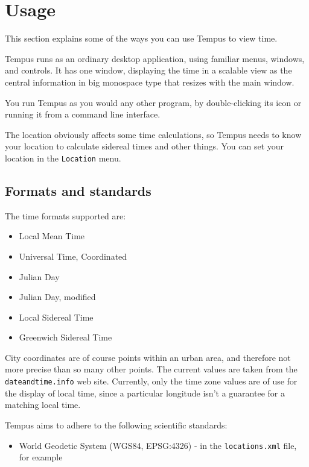 \section{Usage}

This section explains some of the ways you can use Tempus to view time.

Tempus runs as an ordinary desktop application, using familiar menus, windows, and controls. It has one window, displaying the time in a scalable view as the central information in big monospace type that resizes with the main window.

You run Tempus as you would any other program, by double-clicking its icon or running it from a command line interface. 

The location obviously affects some time calculations, so Tempus needs to know your location to calculate sidereal times and other things. You can set your location in the \texttt{Location} menu.

\subsection{Formats and standards}

The time formats supported are:
\begin{itemize}
    \item Local Mean Time
    \item Universal Time, Coordinated
    \item Julian Day
    \item Julian Day, modified
    \item Local Sidereal Time
    \item Greenwich Sidereal Time
\end{itemize}

City coordinates are of course points within an urban area, and therefore not more precise than so many other points. The current values are taken from the \texttt{dateandtime.info} web site. Currently, only the time zone values are of use for the display of local time, since a particular longitude isn't a guarantee for a matching local time.

Tempus aims to adhere to the following scientific standards:

\begin{itemize}
    \item World Geodetic System (WGS84, EPSG:4326) - in the \texttt{locations.xml} file, for example
\end{itemize}

